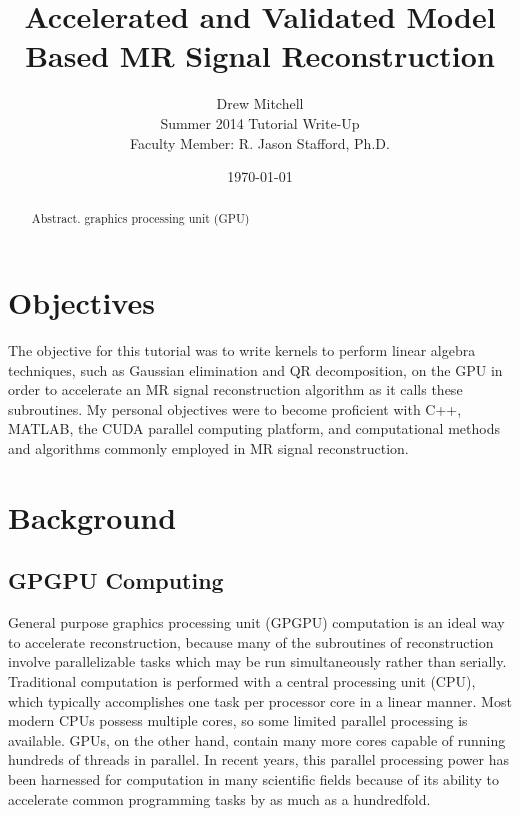 \documentclass{article}
\begin{document}
\title{Accelerated and Validated Model Based MR Signal Reconstruction}
\author{Drew Mitchell\\
	Summer 2014 Tutorial Write-Up\\
	Faculty Member: R. Jason Stafford, Ph.D.}
\date{\today}
\maketitle

\begin{abstract}

Abstract. graphics processing unit (GPU)

\end{abstract}

\section*{Objectives}

The objective for this tutorial was to write kernels to perform linear algebra techniques, such as Gaussian elimination and QR decomposition, on the GPU in order to accelerate an MR signal reconstruction algorithm as it calls these subroutines. My personal objectives were to become proficient with C++, MATLAB, the CUDA parallel computing platform, and computational methods and algorithms commonly employed in MR signal reconstruction.

\section*{Background}

\subsection*{GPGPU Computing}
General purpose graphics processing unit (GPGPU) computation is an ideal way to accelerate reconstruction, because many of the subroutines of reconstruction involve parallelizable tasks which may be run simultaneously rather than serially. Traditional computation is performed with a central processing unit (CPU), which typically accomplishes one task per processor core in a linear manner. Most modern CPUs possess multiple cores, so some limited parallel processing is available. GPUs, on the other hand, contain many more cores capable of running hundreds of threads in parallel. In recent years, this parallel processing power has been harnessed for computation in many scientific fields because of its ability to accelerate common programming tasks by as much as a hundredfold.
\end{document}
